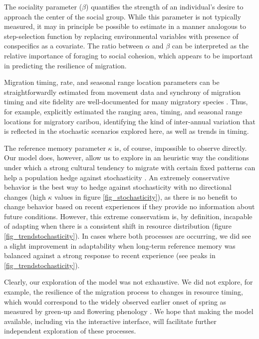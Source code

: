 \documentclass[utf8]{frontiersSCNS} %
\begin{document}
	The sociality parameter ($\beta$) quantifies the strength of an individual's desire to approach the center of the social group. While this parameter is not typically measured, it may in principle be possible to estimate in a manner analogous to step-selection function by replacing environmental variables with presence of conspecifics as a covariate. The ratio between $\alpha$ and $\beta$ can be interpreted as the relative importance of foraging to social cohesion, which appears to be important in predicting the resilience of migration. 
	
	Migration timing, rate, and seasonal range location parameters can be straightforwardly estimated from movement data \citep{Cagnacci2015, Gurarie2019} and synchrony of migration timing and site fidelity are well-documented for many migratory species \citep{Joly2021}. Thus, for example, \citet{Gurarie2019} explicitly estimated the ranging area, timing, and seasonal range locations for migratory caribou, identifying the kind of inter-annual variation that is reflected in the stochastic scenarios explored here, as well as trends in timing. 
	
	The reference memory parameter $\kappa$ is, of course, impossible to observe directly.  Our model does, however, allow us to explore in an heuristic way the conditions under which a strong cultural tendency to migrate with certain fixed patterns can help a population hedge against stochasticity \citep{Abrahms2019,Fagan2019b}. An extremely conservative behavior is the best way to hedge against stochasticity with no directional changes (high $\kappa$ values in figure \ref{fig_stochasticity}), as there is no benefit to change behavior based on recent experiences if they provide no information about future conditions. However, this extreme conservatism is, by definition, incapable of adapting when there is a consistent shift in resource distribution (figure \ref{fig_trendstochasticity}).  In cases where both processes are occurring, we did see a slight improvement in adaptability when long-term reference memory was balanced against a strong response to recent experience (see peaks in \ref{fig_trendstochasticity}). 
		
	Clearly, our exploration of the model was not exhaustive.  We did not explore, for example, the resilience of the migration process to changes in resource timing, which would correspond to the widely observed earlier onset of spring as measured by green-up and flowering phenology \citep{Cleland2007}. We hope that making the model available, including via the interactive interface, will facilitate further independent exploration of these processes.  \\
	 	
\end{document}
